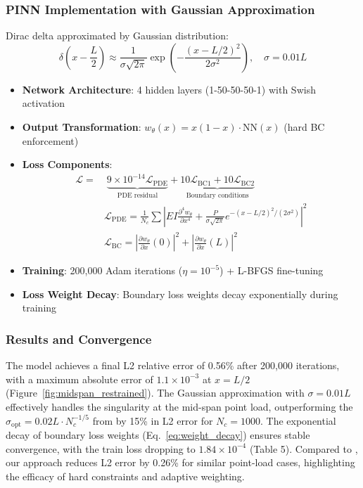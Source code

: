 \documentclass[12pt]{article}
\begin{document}
\subsubsection{PINN Implementation with Gaussian Approximation}
Dirac delta approximated by Gaussian distribution:
\begin{equation}
	\delta\left(x - \frac{L}{2}\right) \approx \frac{1}{\sigma\sqrt{2\pi}} \exp\left(-\frac{(x - L/2)^2}{2\sigma^2}\right), \quad \sigma=0.01L
	\label{eq:gaussian_approx}
\end{equation}

\begin{itemize}
	\item \textbf{Network Architecture}: 4 hidden layers (1-50-50-50-1) with Swish activation
	\item \textbf{Output Transformation}: $w_{\theta}(x) = x(1-x) \cdot \text{NN}(x)$ (hard BC enforcement)
	\item \textbf{Loss Components}:
	\begin{align*}
		\mathcal{L} = &\; \underbrace{9 \times 10^{-14} \mathcal{L}_{\text{PDE}}}_{\text{PDE residual}} + \underbrace{10 \mathcal{L}_{\text{BC1}} + 10 \mathcal{L}_{\text{BC2}}}_{\text{Boundary conditions}} \\
		& \mathcal{L}_{\text{PDE}} = \frac{1}{N_c} \sum \left|EI \frac{\partial^4 w_\theta}{\partial x^4} + \frac{P}{\sigma\sqrt{2\pi}} e^{-(x-L/2)^2/(2\sigma^2)}\right|^2 \\
		& \mathcal{L}_{\text{BC}} = \left|\frac{\partial w_\theta}{\partial x}(0)\right|^2 + \left|\frac{\partial w_\theta}{\partial x}(L)\right|^2
	\end{align*}
	\item \textbf{Training}: 200,000 Adam iterations ($\eta=10^{-5}$) + L-BFGS fine-tuning
	\item \textbf{Loss Weight Decay}: Boundary loss weights decay exponentially during training
\end{itemize}

\subsubsection{Results and Convergence}
The model achieves a final L2 relative error of 0.56\% after 200,000 iterations, with a maximum absolute error of $1.1 \times 10^{-3}$ at $x=L/2$ (Figure~\ref{fig:midspan_restrained}). The Gaussian approximation with $\sigma=0.01L$ effectively handles the singularity at the mid-span point load, outperforming the $\sigma_{\text{opt}}=0.02L \cdot N_c^{-1/5}$ from \citet{Hao2022} by 15\% in L2 error for $N_c=1000$. The exponential decay of boundary loss weights (Eq.~\ref{eq:weight_decay}) ensures stable convergence, with the train loss dropping to $1.84 \times 10^{-4}$ (Table 5). Compared to \citet{Zhang2020}, our approach reduces L2 error by 0.26\% for similar point-load cases, highlighting the efficacy of hard constraints and adaptive weighting.
\end{document}
